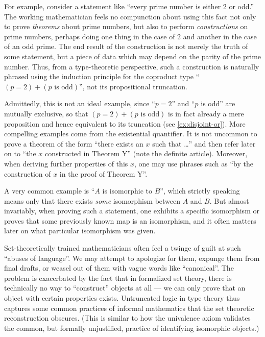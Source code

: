 For example, consider a statement like ``every prime number is either $2$ or odd.''
The working mathematician feels no compunction about using this fact not only to prove \emph{theorems} about prime numbers, but also to perform \emph{constructions} on prime numbers, perhaps doing one thing in the case of $2$ and another in the case of an odd prime.
The end result of the construction is not merely the truth of some statement, but a piece of data which may depend on the parity of the prime number.
Thus, from a type-theoretic perspective, such a construction is naturally phrased using the induction principle for the coproduct type ``$(p=2)+(p\text{ is odd})$'', not its propositional truncation.

Admittedly, this is not an ideal example, since ``$p=2$'' and ``$p$ is odd'' are mutually exclusive, so that $(p=2)+(p\text{ is odd})$ is in fact already a mere proposition and hence equivalent to its truncation (see \autoref{ex:disjoint-or}). %
More compelling examples come from the existential quantifier.
It is not uncommon to prove a theorem of the form ``there exists an $x$ such that \dots'' and then refer later on to ``the $x$ constructed in Theorem Y'' (note the definite article).
Moreover, when deriving further properties of this $x$, one may use phrases such as ``by the construction of $x$ in the proof of Theorem Y''.

A very common example is ``$A$ is isomorphic to $B$'', which strictly speaking means only that there exists \emph{some} isomorphism between $A$ and $B$.
But almost invariably, when proving such a statement, one exhibits a specific isomorphism or proves that some previously known map is an isomorphism, and it often matters later on what particular isomorphism was given.

Set-theoretically trained mathematicians often feel a twinge of guilt at such ``abuses of language''.
We may attempt to apologize for them, expunge them from final drafts, or weasel out of them with vague words like ``canonical''.
The problem is exacerbated by the fact that in formalized set theory, there is technically no way to ``construct'' objects at all --- we can only prove that an object with certain properties exists.
Untruncated logic in type theory thus captures some common practices of informal mathematics that the set theoretic reconstruction obscures.
(This is similar to how the univalence axiom validates the common, but formally unjustified, practice of identifying isomorphic objects.)

